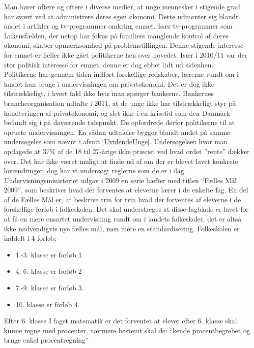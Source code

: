Man hører oftere og oftere i diverse medier, at unge mennesker i stigende grad har svært ved at administrere deres egen økonomi. Dette udmønter sig blandt andet i artikler og tv-programmer omkring emnet. Især tv-programmer som Luksusfælden, der netop har fokus på familiers manglende kontrol af deres økonomi, skaber opmærksomhed på problemstillingen. Denne stigende interesse for emnet er heller ikke gået politikerne hen over hovedet. Især i 2010/11 var der stor politisk interesse for emnet, denne er dog ebbet lidt ud sidenhen.\\

Politikerne har gennem tiden indført forskellige redskaber, lærerne rundt om i landet kan bruge i undervisningen om privatøkonomi. Det er dog ikke tilstrækkeligt, i hvert fald ikke hvis man spørger bankerne. Bankernes brancheorganisation udtalte i 2011, at de unge ikke har tilstrækkeligt styr på håndteringen af privatøkonomi, og slet ikke i en krisetid som den Danmark befandt sig i på daværende tidspunkt. De opfordrede derfor politikerne til at opruste undervisningen. En sådan udtalelse bygger blandt andet på samme undersøgelse som nævnt i afsnit \ref{UvidendeUnge}. Undersøgelsen hvor man opdagede at 37\% af de 18 til 27-årige ikke præcist ved hvad ordet ”rente” dækker over.  Det har ikke været muligt at finde ud af om der er blevet lavet konkrete lovændringer, dog har vi undersøgt reglerne som de er i dag.\\ %

Undervisningsministeriet udgav i 2009 en serie hæfter med titlen “Fælles Mål 2009”, som beskriver hvad der forventes at eleverne lærer i de enkelte fag. En del af de Fælles Mål er, at beskrive trin for trin hvad der forventes af eleverne i de forskellige forløb i folkeskolen. Det skal understreges at disse fagblade er lavet for at få en mere ensartet undervisning rundt om i landets folkeskoler, det er altså ikke nødvendigvis nye fælles mål, men mere en standardisering. 
Folkeskolen er inddelt i 4 forløb;

\noindent \begin{itemize}
\item{1.-3. klasse er forløb 1.}
\item{4.-6. klasse er forløb 2}
\item{7.-9. klasse er forløb 3.}
\item{10. klasse er forløb 4.}\\
\end{itemize}

Efter 6. klasse
I faget matematik er det forventet at elever efter 6. klasse skal kunne regne med procenter,
nærmere bestemt skal de: “kende procentbegrebet og bruge enkel procentregning” \cite{FallesMalMatematik}\\

